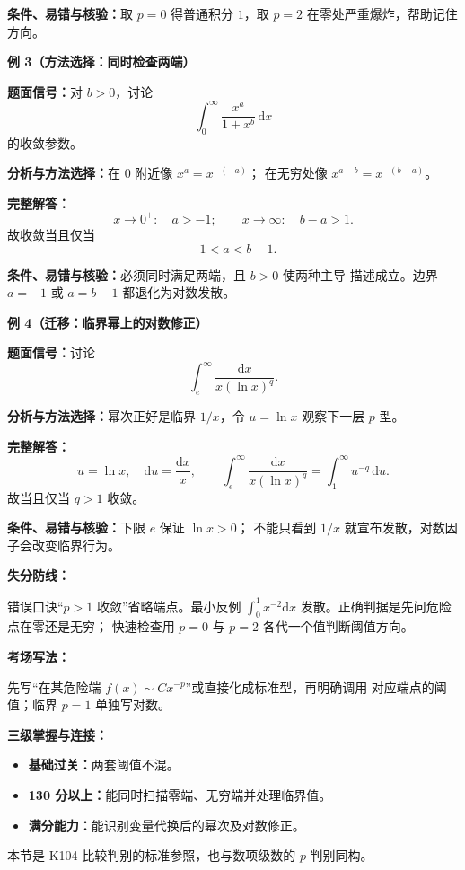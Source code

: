 \begin{knowledgeBox}
\textbf{条件、易错与核验：}取 \(p=0\) 得普通积分 \(1\)，取 \(p=2\)
在零处严重爆炸，帮助记住方向。

\textbf{例 3（方法选择：同时检查两端）}

\textbf{题面信号：}对 \(b>0\)，讨论
\[
\int_0^\infty\frac{x^a}{1+x^b}\,\mathrm dx
\]
的收敛参数。

\textbf{分析与方法选择：}在 \(0\) 附近像 \(x^a=x^{-(-a)}\)；
在无穷处像 \(x^{a-b}=x^{-(b-a)}\)。

\textbf{完整解答：}
\[
x\to0^+:\quad a>-1;
\qquad
x\to\infty:\quad b-a>1.
\]
故收敛当且仅当
\[
\boxed{-1<a<b-1}.
\]

\textbf{条件、易错与核验：}必须同时满足两端，且 \(b>0\) 使两种主导
描述成立。边界 \(a=-1\) 或 \(a=b-1\) 都退化为对数发散。

\textbf{例 4（迁移：临界幂上的对数修正）}

\textbf{题面信号：}讨论
\[
\int_e^\infty\frac{\mathrm dx}{x(\ln x)^q}.
\]

\textbf{分析与方法选择：}幂次正好是临界 \(1/x\)，令 \(u=\ln x\)
观察下一层 \(p\) 型。

\textbf{完整解答：}
\[
u=\ln x,\quad \mathrm du=\frac{\mathrm dx}{x},\qquad
\int_e^\infty\frac{\mathrm dx}{x(\ln x)^q}
=\int_1^\infty u^{-q}\,\mathrm du.
\]
故当且仅当 \(q>1\) 收敛。

\textbf{条件、易错与核验：}下限 \(e\) 保证 \(\ln x>0\)；
不能只看到 \(1/x\) 就宣布发散，对数因子会改变临界行为。

\textbf{失分防线：}

错误口诀“\(p>1\) 收敛”省略端点。最小反例
\(\int_0^1x^{-2}\mathrm dx\) 发散。正确判据是先问危险点在零还是无穷；
快速检查用 \(p=0\) 与 \(p=2\) 各代一个值判断阈值方向。

\textbf{考场写法：}

先写“在某危险端 \(f(x)\sim Cx^{-p}\)”或直接化成标准型，再明确调用
对应端点的阈值；临界 \(p=1\) 单独写对数。

\textbf{三级掌握与连接：}
\begin{itemize}
  \item \textbf{基础过关：}两套阈值不混。
  \item \textbf{130 分以上：}能同时扫描零端、无穷端并处理临界值。
  \item \textbf{满分能力：}能识别变量代换后的幂次及对数修正。
\end{itemize}
本节是 K104 比较判别的标准参照，也与数项级数的 \(p\) 判别同构。
\end{knowledgeBox}


